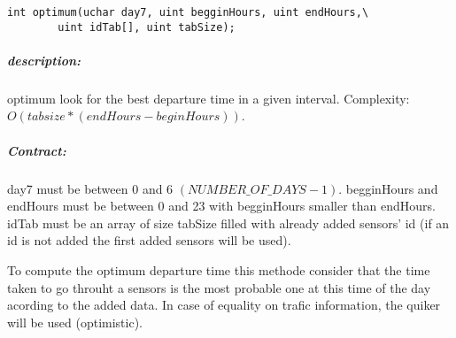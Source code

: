 \documentclass[a4paper, 12pts]{article}
\begin{document}
	\begin{lstlisting}
int optimum(uchar day7, uint begginHours, uint endHours,\
		uint idTab[], uint tabSize);
	\end{lstlisting}
	\subparagraph{description:}
		optimum look for the best departure time in a given interval. Complexity: $O(tabsize * (endHours-beginHours) )$.
	\subparagraph{Contract:}
		day7 must be between 0 and 6 $(NUMBER\_OF\_DAYS-1)$. begginHours and endHours must be between 0 and 23 with begginHours smaller than endHours. idTab must be an array of size tabSize filled with already added sensors' id (if an id is not added the first added sensors will be used).
	
		To compute the optimum departure time this methode consider that the time taken to go throuht a sensors is the most probable one at this time of the day acording to the added data. In case of equality on trafic information, the quiker will be used (optimistic).
\end{document}
